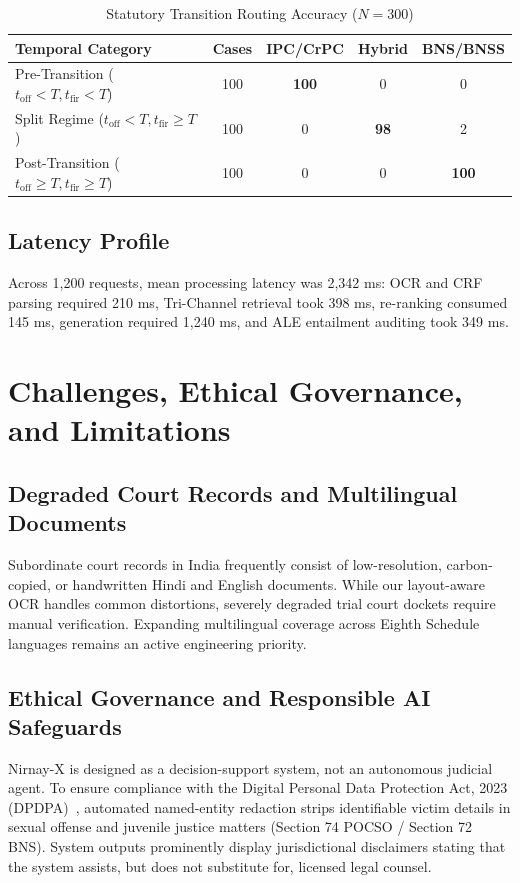 \documentclass[conference]{IEEEtran}
\begin{document}
\begin{table}[!t]
\caption{Statutory Transition Routing Accuracy ($N=300$)}
\label{tab:transition_matrix}
\centering
\footnotesize
\setlength{\tabcolsep}{2.5pt}
\begin{tabularx}{\columnwidth}{>{\raggedright\arraybackslash}Xcccc}
\toprule
\textbf{Temporal Category} & \textbf{Cases} & \textbf{IPC/CrPC} & \textbf{Hybrid} & \textbf{BNS/BNSS} \\
\midrule
Pre-Transition ($t_{\text{off}} < T, t_{\text{fir}} < T$) & 100 & \textbf{100} & 0 & 0 \\
Split Regime ($t_{\text{off}} < T, t_{\text{fir}} \ge T$) & 100 & 0 & \textbf{98} & 2 \\
Post-Transition ($t_{\text{off}} \ge T, t_{\text{fir}} \ge T$) & 100 & 0 & 0 & \textbf{100} \\
\bottomrule
\end{tabularx}
\end{table}

\subsection{Latency Profile}
Across 1,200 requests, mean processing latency was 2,342 ms: OCR and CRF parsing required 210 ms, Tri-Channel retrieval took 398 ms, re-ranking consumed 145 ms, generation required 1,240 ms, and ALE entailment auditing took 349 ms.

\section{Challenges, Ethical Governance, and Limitations}

\subsection{Degraded Court Records and Multilingual Documents}
Subordinate court records in India frequently consist of low-resolution, carbon-copied, or handwritten Hindi and English documents. While our layout-aware OCR handles common distortions, severely degraded trial court dockets require manual verification. Expanding multilingual coverage across Eighth Schedule languages remains an active engineering priority.

\subsection{Ethical Governance and Responsible AI Safeguards}
Nirnay-X is designed as a decision-support system, not an autonomous judicial agent. To ensure compliance with the Digital Personal Data Protection Act, 2023 (DPDPA)~\cite{dpdpa2023}, automated named-entity redaction strips identifiable victim details in sexual offense and juvenile justice matters (Section 74 POCSO / Section 72 BNS). System outputs prominently display jurisdictional disclaimers stating that the system assists, but does not substitute for, licensed legal counsel.
\end{document}
